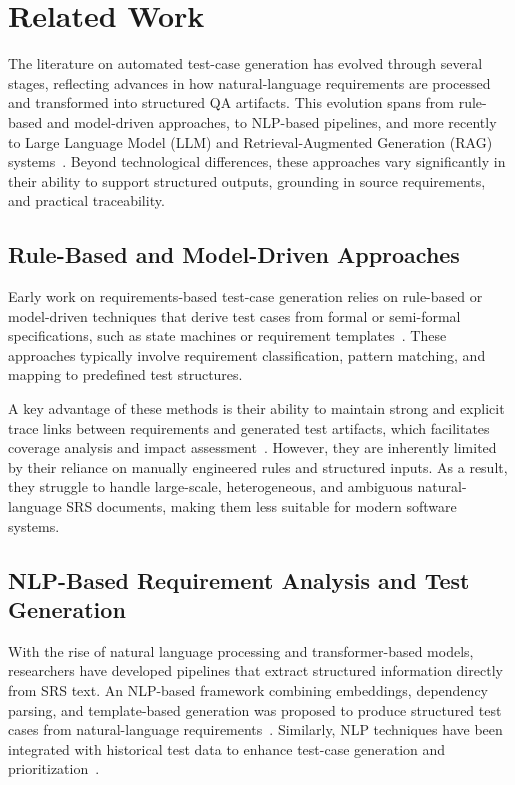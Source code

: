 \documentclass[conference]{IEEEtran}
\begin{document}
\section{Related Work}
\label{sec:related}

The literature on automated test-case generation has evolved through several stages, reflecting advances in how natural-language requirements are processed and transformed into structured QA artifacts. This evolution spans from rule-based and model-driven approaches, to NLP-based pipelines, and more recently to Large Language Model (LLM) and Retrieval-Augmented Generation (RAG) systems~\cite{Khurshid2021AutomatedTCG,Kumar2025NLRequirements,Arora2024RAGTAG,RE2025SurveyRBTG}. Beyond technological differences, these approaches vary significantly in their ability to support structured outputs, grounding in source requirements, and practical traceability.

\subsection{Rule-Based and Model-Driven Approaches}

Early work on requirements-based test-case generation relies on rule-based or model-driven techniques that derive test cases from formal or semi-formal specifications, such as state machines or requirement templates~\cite{Khurshid2021AutomatedTCG,Li2010MiningTestCases}. These approaches typically involve requirement classification, pattern matching, and mapping to predefined test structures.

A key advantage of these methods is their ability to maintain strong and explicit trace links between requirements and generated test artifacts, which facilitates coverage analysis and impact assessment~\cite{Khurshid2021AutomatedTCG}. However, they are inherently limited by their reliance on manually engineered rules and structured inputs. As a result, they struggle to handle large-scale, heterogeneous, and ambiguous natural-language SRS documents, making them less suitable for modern software systems.

\subsection{NLP-Based Requirement Analysis and Test Generation}

With the rise of natural language processing and transformer-based models, researchers have developed pipelines that extract structured information directly from SRS text. An NLP-based framework combining embeddings, dependency parsing, and template-based generation was proposed to produce structured test cases from natural-language requirements~\cite{Kumar2025NLRequirements}. Similarly, NLP techniques have been integrated with historical test data to enhance test-case generation and prioritization~\cite{Ghosh2023NLPTestCases}.
\end{document}
